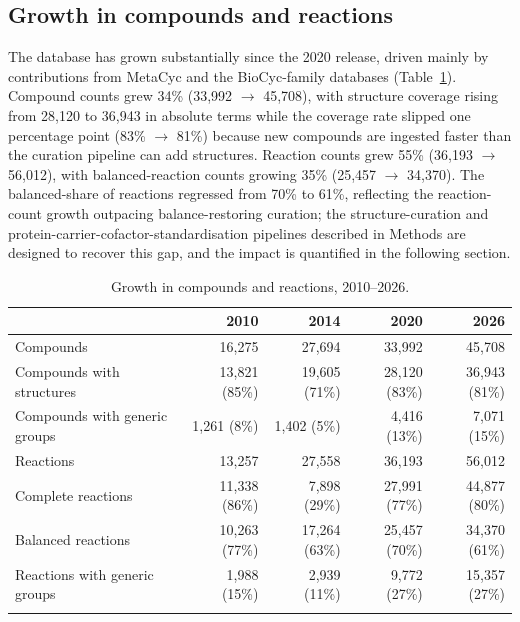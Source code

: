 \subsection{Growth in compounds and reactions}

The database has grown substantially since the 2020 release, driven mainly by
contributions from MetaCyc and the BioCyc-family databases (Table~\ref{tab:growth}).
Compound counts grew 34\% (33,992 $\rightarrow$ 45,708), with structure coverage
rising from 28,120 to 36,943 in absolute terms while the coverage rate slipped
one percentage point (83\% $\rightarrow$ 81\%) because new compounds are ingested
faster than the curation pipeline can add structures. Reaction counts grew 55\%
(36,193 $\rightarrow$ 56,012), with balanced-reaction counts growing 35\%
(25,457 $\rightarrow$ 34,370). The balanced-share of reactions regressed from
70\% to 61\%, reflecting the reaction-count growth outpacing balance-restoring
curation; the structure-curation and protein-carrier-cofactor-standardisation
pipelines described in Methods are designed to recover this gap, and the impact
is quantified in the following section.

\begin{table}[!t]
\caption{Growth in compounds and reactions, 2010--2026.\label{tab:growth}}%
\begin{tabular*}{\textwidth}{@{\extracolsep\fill}lrrrr@{\extracolsep\fill}}
\toprule
 & 2010 & 2014 & 2020 & 2026 \\
\midrule
Compounds                      & 16,275       & 27,694       & 33,992       & 45,708 \\
Compounds with structures      & 13,821 (85\%) & 19,605 (71\%) & 28,120 (83\%) & 36,943 (81\%) \\
Compounds with generic groups  & 1,261 (8\%)   & 1,402 (5\%)   & 4,416 (13\%)  & 7,071 (15\%) \\
Reactions                      & 13,257       & 27,558       & 36,193       & 56,012 \\
Complete reactions             & 11,338 (86\%) & 7,898 (29\%)  & 27,991 (77\%) & 44,877 (80\%) \\
Balanced reactions             & 10,263 (77\%) & 17,264 (63\%) & 25,457 (70\%) & 34,370 (61\%) \\
Reactions with generic groups  & 1,988 (15\%)  & 2,939 (11\%)  & 9,772 (27\%)  & 15,357 (27\%) \\
\botrule
\end{tabular*}
\end{table}

